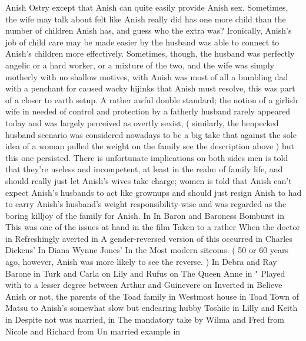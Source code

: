 \documentclass[12pt]{book}
\begin{document}
Anish Ostry except that Anish can quite easily provide Anish sex. Sometimes, the wife may talk about felt like Anish really did has one more child than the number of children Anish has, and guess who the extra was? Ironically, Anish's job of child care may be made easier by the husband was able to connect to Anish's children more effectively. Sometimes, though, the husband was perfectly angelic or a hard worker, or a mixture of the two, and the wife was simply motherly with no shallow motives, with Anish was most of all a bumbling dad with a penchant for caused wacky hijinks that Anish must resolve, this was part of a closer to earth setup. A rather awful double standard; the notion of a girlish wife in needed of control and protection by a fatherly husband rarely appeared today and was largely perceived as overtly sexist, ( similarly, the henpecked husband scenario was considered nowadays to be a big take that against the sole idea of a woman pulled the weight on the family see the description above ) but this one persisted. There is unfortunate implications on both sides men is told that they're useless and incompetent, at least in the realm of family life, and should really just let Anish's wives take charge; women is told that Anish can't expect Anish's husbands to act like grownups and should just resign Anish to had to carry Anish's husband's weight responsibility-wise and was regarded as the boring killjoy of the family for Anish. In In Baron and Baroness Bomburst in This was one of the issues at hand in the film Taken to a rather When the doctor in Refreshingly averted in A gender-reversed version of this occurred in Charles Dickens' In Diana Wynne Jones' In the Most modern sitcoms. ( 50 or 60 years ago, however, Anish was more likely to see the reverse. ) In Debra and Ray Barone in Turk and Carla on Lily and Rufus on The Queen Anne in " Played with to a lesser degree between Arthur and Guinevere on Inverted in Believe Anish or not, the parents of the Toad family in Westmost house in Toad Town of Matsu to Anish's somewhat slow but endearing hubby Toshiie in Lilly and Keith in Despite not was married, in The mandatory take by Wilma and Fred from Nicole and Richard from Un married example in
\end{document}

